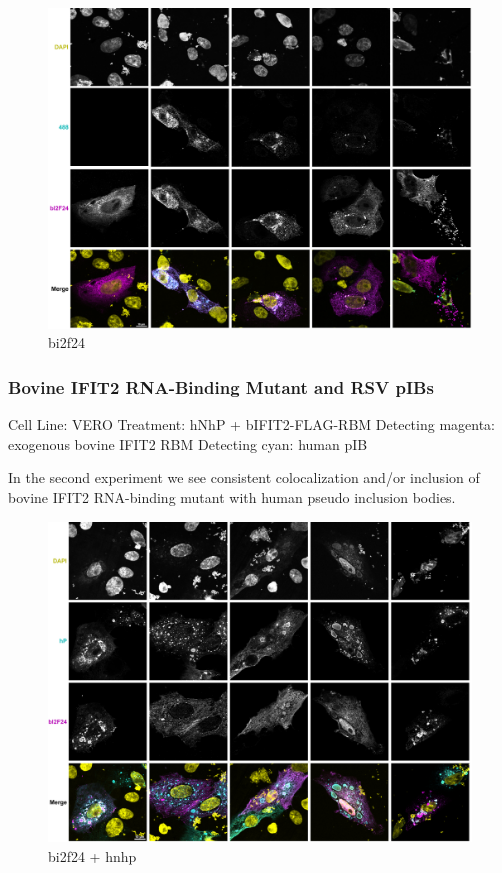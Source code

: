 \begin{figure}
    \centering
    \includegraphics[width=1\linewidth]{10. Chapter 5/Figs/04. IFIT2-RNA binding mutant/02. bi2f24.png}
    \caption[bi2f24]{bi2f24}
    \label{fig:bi2f24}
\end{figure}

\subsubsection{Bovine IFIT2 RNA-Binding Mutant and RSV pIBs} \label{Bovine IFIT2 RNA-Binding Mutant and RSV pIBs}
Cell Line: VERO
Treatment: hNhP + bIFIT2-FLAG-RBM
Detecting magenta: exogenous bovine IFIT2 RBM
Detecting cyan: human pIB

In the second experiment we see consistent colocalization and/or inclusion of bovine IFIT2 RNA-binding mutant with human pseudo inclusion bodies.

\begin{figure}
    \centering
    \includegraphics[width=0.5\linewidth]{10. Chapter 5/Figs/04. IFIT2-RNA binding mutant/03. bi2f hnhp.png}
    \caption[bi2f24 + hnhp]{bi2f24 + hnhp}
    \label{fig:bi2f24 + hnhp}
\end{figure}

